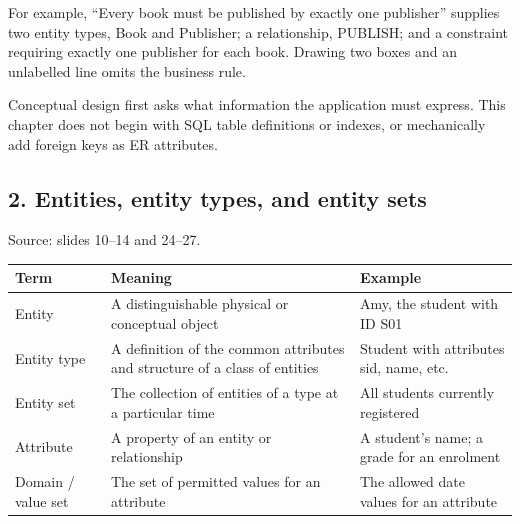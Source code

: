 For example, ``Every book must be published by exactly one publisher'' supplies two entity types, Book and Publisher; a relationship, PUBLISH; and a constraint requiring exactly one publisher for each book. Drawing two boxes and an unlabelled line omits the business rule.

Conceptual design first asks what information the application must express. This chapter does not begin with SQL table definitions or indexes, or mechanically add foreign keys as ER attributes.

\subsection{2. Entities, entity types, and entity sets}\label{02_er_modelling_en-entities-entity-types-and-entity-sets}

Source: slides 10--14 and 24--27.

\begin{longtable}[]{@{}
  >{\raggedright\arraybackslash}p{}
  >{\raggedright\arraybackslash}p{}
  >{\raggedright\arraybackslash}p{}@{}}
\toprule\noalign{}
\begin{minipage}[b]{\linewidth}\raggedright
Term
\end{minipage} & \begin{minipage}[b]{\linewidth}\raggedright
Meaning
\end{minipage} & \begin{minipage}[b]{\linewidth}\raggedright
Example
\end{minipage} \\
\midrule\noalign{}
\endhead
\bottomrule\noalign{}
\endlastfoot
Entity & A distinguishable physical or conceptual object & Amy, the student with ID S01 \\
Entity type & A definition of the common attributes and structure of a class of entities & Student with attributes sid, name, etc. \\
Entity set & The collection of entities of a type at a particular time & All students currently registered \\
Attribute & A property of an entity or relationship & A student's name; a grade for an enrolment \\
Domain / value set & The set of permitted values for an attribute & The allowed date values for an attribute \\
\end{longtable}

